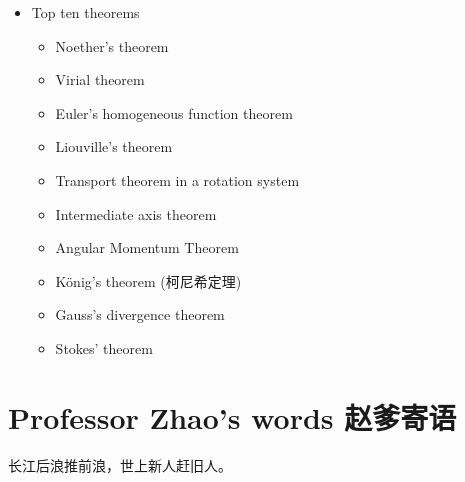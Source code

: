 \begin{itemize}
\tightlist{}
\item
  Top ten theorems

  \begin{itemize}
\tightlist{}
  \item
    Noether's theorem
  \item
    Virial theorem
  \item
    Euler's homogeneous function theorem
  \item
    Liouville's theorem
  \item
    Transport theorem in a rotation system
  \item
    Intermediate axis theorem
  \item
    Angular Momentum Theorem
  \item
    König's theorem (柯尼希定理)
  \item
    Gauss's divergence theorem
  \item
    Stokes' theorem
  \end{itemize}
\end{itemize}

\section{Professor Zhao's words
赵爹寄语}\label{professor-zhaos-words-ux8d75ux7239ux5bc4ux8bed}

长江后浪推前浪，世上新人赶旧人。
